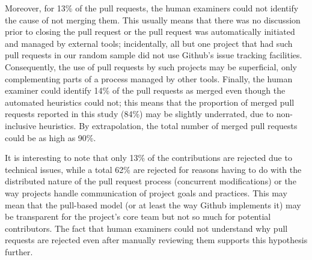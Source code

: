 \documentclass{sig-alternate}
\begin{document}
Moreover, for 13\% of the pull requests, the human examiners could not identify
the cause of not merging them. This usually means that there was no discussion
prior to closing the pull request or the pull request was automatically
initiated and managed by external tools; incidentally, all but one project that
had such pull requests in our random sample did not use Github's issue tracking
facilities. Consequently, the use of pull requests by such projects may be
superficial, only complementing parts of a process managed by other tools.
Finally, the human examiner could identify 14\% of the pull requests as merged
even though the automated heuristics could not; this means that the proportion
of merged pull requests reported in this study (84\%) may be slightly
underrated, due to non-inclusive heuristics. By extrapolation, the total number
of merged pull requests could be as high as 90\%.

It is interesting to note that only 13\% of the contributions are rejected due
to technical issues, while a total 62\% are rejected for reasons having to do
with the distributed nature of the pull request process (concurrent
modifications) or the way projects handle communication of project goals and
practices. This may mean that the pull-based model (or at least the way Github
implements it) may be transparent for the project's core team but not so much
for potential contributors. The fact that human examiners could not understand
why pull requests are rejected even after manually reviewing them supports this
hypothesis further.

\noindent
{}
\end{document}
